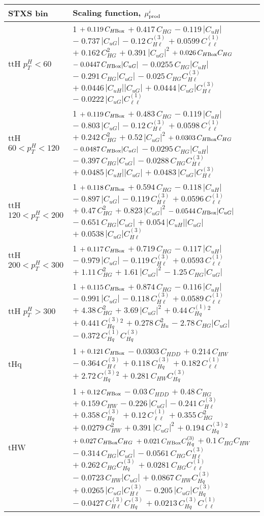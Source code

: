 \begin{tabular}{l|p{}}
    STXS bin & Scaling function, $\mu^i_{\rm{prod}}$ \\ \hline
    ttH $p_{T}^{H} < 60$ & 1 $+\;0.119\,C_{H\rm{Box}}$ $+\;0.417\,C_{HG}$ $-\;0.119\,|C_{uH}|$ $-\;0.737\,|C_{uG}|$ $-\;0.12\,C^{(3)}_{H\ell}$ $+\;0.0599\,C^{(1)}_{\ell\ell}$ $+\;0.162\,C_{HG}^{2}$ $+\;0.391\,|C_{uG}|^{2}$ $+\;0.026\,C_{H\rm{Box}}C_{HG}$ $-\;0.0447\,C_{H\rm{Box}}|C_{uG}|$ $-\;0.0255\,C_{HG}|C_{uH}|$ $-\;0.291\,C_{HG}|C_{uG}|$ $-\;0.025\,C_{HG}C^{(3)}_{H\ell}$ $+\;0.0446\,|C_{uH}||C_{uG}|$ $+\;0.0444\,|C_{uG}|C^{(3)}_{H\ell}$ $-\;0.0222\,|C_{uG}|C^{(1)}_{\ell\ell}$ \\
    ttH $60 < p_{T}^{H} < 120$ & 1 $+\;0.119\,C_{H\rm{Box}}$ $+\;0.483\,C_{HG}$ $-\;0.119\,|C_{uH}|$ $-\;0.803\,|C_{uG}|$ $-\;0.12\,C^{(3)}_{H\ell}$ $+\;0.0598\,C^{(1)}_{\ell\ell}$ $+\;0.242\,C_{HG}^{2}$ $+\;0.52\,|C_{uG}|^{2}$ $+\;0.0303\,C_{H\rm{Box}}C_{HG}$ $-\;0.0487\,C_{H\rm{Box}}|C_{uG}|$ $-\;0.0295\,C_{HG}|C_{uH}|$ $-\;0.397\,C_{HG}|C_{uG}|$ $-\;0.0288\,C_{HG}C^{(3)}_{H\ell}$ $+\;0.0485\,|C_{uH}||C_{uG}|$ $+\;0.0483\,|C_{uG}|C^{(3)}_{H\ell}$ \\
    ttH $120 < p_{T}^{H} < 200$ & 1 $+\;0.118\,C_{H\rm{Box}}$ $+\;0.594\,C_{HG}$ $-\;0.118\,|C_{uH}|$ $-\;0.897\,|C_{uG}|$ $-\;0.119\,C^{(3)}_{H\ell}$ $+\;0.0596\,C^{(1)}_{\ell\ell}$ $+\;0.47\,C_{HG}^{2}$ $+\;0.823\,|C_{uG}|^{2}$ $-\;0.0544\,C_{H\rm{Box}}|C_{uG}|$ $-\;0.651\,C_{HG}|C_{uG}|$ $+\;0.054\,|C_{uH}||C_{uG}|$ $+\;0.0538\,|C_{uG}|C^{(3)}_{H\ell}$ \\
    ttH $200 < p_{T}^{H} < 300$ & 1 $+\;0.117\,C_{H\rm{Box}}$ $+\;0.719\,C_{HG}$ $-\;0.117\,|C_{uH}|$ $-\;0.979\,|C_{uG}|$ $-\;0.119\,C^{(3)}_{H\ell}$ $+\;0.0593\,C^{(1)}_{\ell\ell}$ $+\;1.11\,C_{HG}^{2}$ $+\;1.61\,|C_{uG}|^{2}$ $-\;1.25\,C_{HG}|C_{uG}|$ \\
    ttH $p_{T}^{H} > 300$ & 1 $+\;0.115\,C_{H\rm{Box}}$ $+\;0.874\,C_{HG}$ $-\;0.116\,|C_{uH}|$ $-\;0.991\,|C_{uG}|$ $-\;0.118\,C^{(3)}_{H\ell}$ $+\;0.0589\,C^{(1)}_{\ell\ell}$ $+\;4.38\,C_{HG}^{2}$ $+\;3.69\,|C_{uG}|^{2}$ $+\;0.44\,C^{(1)}_{Hq}^{2}$ $+\;0.441\,C^{(3)}_{Hq}^{2}$ $+\;0.278\,C_{Hu}^{2}$ $-\;2.78\,C_{HG}|C_{uG}|$ $-\;0.372\,C^{(1)}_{Hq}C^{(3)}_{Hq}$ \\
    \hline
    tHq & 1 $+\;0.121\,C_{H\rm{Box}}$ $-\;0.0303\,C_{HDD}$ $+\;0.214\,C_{HW}$ $-\;0.364\,C^{(3)}_{H\ell}$ $+\;0.118\,C^{(3)}_{Hq}$ $+\;0.182\,C^{(1)}_{\ell\ell}$ $+\;2.72\,C^{(3)}_{Hq}^{2}$ $+\;0.281\,C_{HW}C^{(3)}_{Hq}$ \\
    \hline
    tHW & 1 $+\;0.12\,C_{H\rm{Box}}$ $-\;0.03\,C_{HDD}$ $+\;0.48\,C_{HG}$ $+\;0.159\,C_{HW}$ $-\;0.226\,|C_{uG}|$ $-\;0.241\,C^{(3)}_{H\ell}$ $+\;0.358\,C^{(3)}_{Hq}$ $+\;0.12\,C^{(1)}_{\ell\ell}$ $+\;0.355\,C_{HG}^{2}$ $+\;0.0279\,C_{HW}^{2}$ $+\;0.391\,|C_{uG}|^{2}$ $+\;0.194\,C^{(3)}_{Hq}^{2}$ $+\;0.027\,C_{H\rm{Box}}C_{HG}$ $+\;0.021\,C_{H\rm{Box}}C^{(3)}_{Hq}$ $+\;0.1\,C_{HG}C_{HW}$ $-\;0.314\,C_{HG}|C_{uG}|$ $-\;0.0561\,C_{HG}C^{(3)}_{H\ell}$ $+\;0.262\,C_{HG}C^{(3)}_{Hq}$ $+\;0.0281\,C_{HG}C^{(1)}_{\ell\ell}$ $-\;0.0723\,C_{HW}|C_{uG}|$ $+\;0.0867\,C_{HW}C^{(3)}_{Hq}$ $+\;0.0265\,|C_{uG}|C^{(3)}_{H\ell}$ $-\;0.205\,|C_{uG}|C^{(3)}_{Hq}$ $-\;0.0427\,C^{(3)}_{H\ell}C^{(3)}_{Hq}$ $+\;0.0213\,C^{(3)}_{Hq}C^{(1)}_{\ell\ell}$ \\

\end{tabular}
